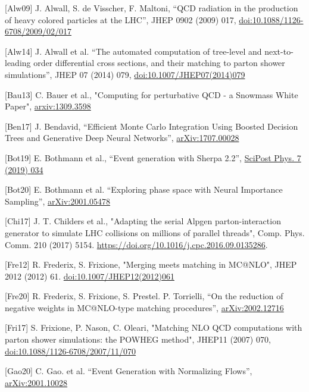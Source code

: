 \documentclass[10pt,a4paper]{article}
\begin{document}
{[}Alw09{]} J. Alwall, S. de Visscher, F. Maltoni, ``QCD radiation in
the production of heavy colored particles at the LHC'', JHEP 0902 (2009)
017,
\href{https://doi.org/10.1088/1126-6708/2009/02/017}{{doi:10.1088/1126-6708/2009/02/017}}

{[}Alw14{]} J. Alwall et al. ``The automated computation of tree-level
and next-to-leading order differential cross sections, and their
matching to parton shower simulations'', JHEP 07 (2014) 079,
\href{https://doi.org/10.1007/JHEP07(2014)079}{{doi:10.1007/JHEP07(2014)079}}

{[}Bau13{]} C. Bauer et al., "Computing for perturbative QCD - a
Snowmass White Paper",
\href{https://arxiv.org/abs/1309.3598}{{arxiv:1309.3598}}

{[}Ben17{]} J. Bendavid, ``Efficient Monte Carlo Integration Using
Boosted Decision Trees and Generative Deep Neural Networks'',
\href{https://arxiv.org/abs/1707.00028}{{arXiv:1707.00028}}

{[}Bot19{]} E. Bothmann et al., ``Event generation with Sherpa 2.2'',
\href{https://scipost.org/SciPostPhys.7.3.034}{{SciPost Phys. 7 (2019)
034}}

{[}Bot20{]} E. Bothmann et al. ``Exploring phase space with Neural
Importance Sampling'',
\href{https://arxiv.org/abs/2001.05478}{{arXiv:2001.05478}}

{[}Chi17{]} J. T. Childers et al., "Adapting the serial Alpgen
parton-interaction generator to simulate LHC collisions on millions of
parallel threads", Comp. Phys. Comm. 210 (2017) 5154.
\href{https://doi.org/10.1016/j.cpc.2016.09.0135286}{{https://doi.org/10.1016/j.cpc.2016.09.0135286}}.

{[}Fre12{]} R. Frederix, S. Frixione, "Merging meets matching in
MC@NLO", JHEP 2012 (2012) 61.
\href{https://doi.org/10.1007/JHEP12(2012)061}{{doi:10.1007/JHEP12(2012)061}}

{[}Fre20{]} R. Frederix, S. Frixione, S. Prestel. P. Torrielli, ``On the
reduction of negative weights in MC@NLO-type matching procedures'',
\href{https://arxiv.org/abs/2002.12716}{{arXiv:2002.12716}}

{[}Fri17{]} S. Frixione, P. Nason, C. Oleari, "Matching NLO QCD
computations with parton shower simulations: the POWHEG method", JHEP11
(2007) 070,
\href{https://doi.org/10.1088/1126-6708/2007/11/070}{{doi:10.1088/1126-6708/2007/11/070}}

{[}Gao20{]} C. Gao. et al. ``Event Generation with Normalizing Flows'',
\href{https://arxiv.org/abs/2001.10028}{{arXiv:2001.10028}}
\end{document}
